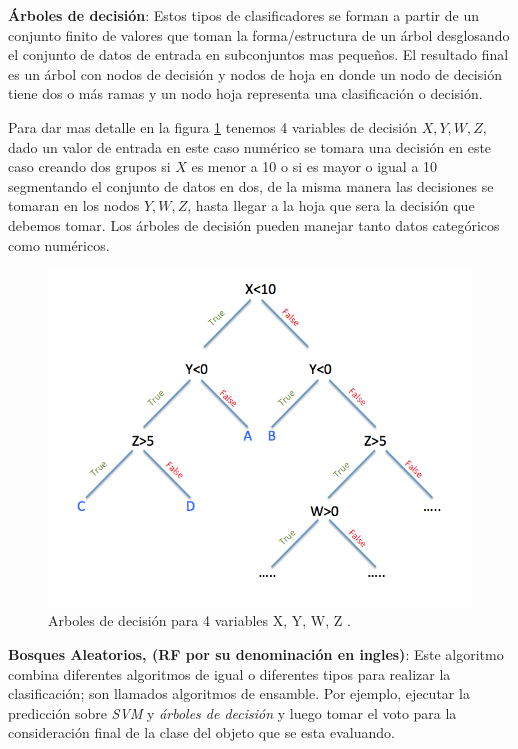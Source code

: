 \par \textbf{Árboles de decisión}: Estos tipos de clasificadores se forman a partir de  un conjunto finito de valores  que toman la forma/estructura de un árbol desglosando el conjunto de datos de entrada en subconjuntos mas pequeños. El resultado final es un árbol con nodos de decisión y nodos de hoja en donde un nodo de decisión tiene dos o más ramas y un nodo hoja representa una clasificación o decisión. 

Para dar mas detalle en la figura \ref{Fig: decision-tree} tenemos 4 variables de decisión $ X, Y, W, Z$, dado un valor  de entrada en este caso numérico se tomara una decisión en este caso creando dos grupos  si $ X$  es menor a 10 o si es mayor o igual a 10 segmentando el conjunto de datos en dos, de la misma manera las decisiones se tomaran en los nodos $ Y, W, Z$, hasta llegar a la hoja que sera la decisión que debemos tomar. Los árboles de decisión pueden manejar tanto datos categóricos como numéricos.

  
\begin{figure}[H]
 \centering
  \includegraphics[scale=0.3,keepaspectratio=true,clip=true]{imagenes/MarcoTeorico/decision-tree.png}
  \caption{Arboles de decisión para 4 variables X, Y, W, Z .}%
  \label{Fig: decision-tree}
\end{figure}


\par \textbf{Bosques Aleatorios, (RF por su denominación en ingles)}: Este  algoritmo combina diferentes algoritmos de igual o diferentes tipos para realizar la clasificación; son llamados algoritmos de ensamble. Por ejemplo, ejecutar la predicción sobre \textit{SVM} y \textit{árboles de decisión} y luego tomar el voto para la consideración final de la clase del objeto que se esta evaluando.  

